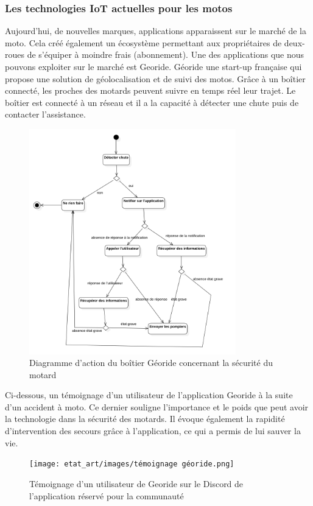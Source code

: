 \subsubsection{Les technologies IoT actuelles pour les motos}
Aujourd'hui, de nouvelles marques, applications\cite{iot_accessoire_moto} apparaissent sur le marché de la moto. Cela créé également un écosystème permettant aux propriétaires de deux-roues de s'équiper à moindre frais (abonnement). Une des applications que nous pouvons exploiter sur le marché est Georide. Géoride une start-up française qui propose une solution de géolocalisation et de suivi des motos. Grâce à un boîtier connecté, les proches des motards peuvent suivre en temps réel leur trajet. Le boîtier est connecté à un réseau et il a la capacité à détecter une chute puis de contacter l'assistance. 
\begin{figure}[H]
    \centering
    \includegraphics[width=0.8\textwidth]{images/diag_etat_georide.png} 
    \caption{Diagramme d'action du boîtier Géoride concernant la sécurité du motard}
\end{figure}
Ci-dessous, un témoignage d'un utilisateur de l'application Georide à la suite d'un accident à moto. Ce dernier souligne l'importance et le poids que peut avoir la technologie dans la sécurité des motards. Il évoque également la rapidité d'intervention des secours grâce à l'application, ce qui a permis de lui sauver la vie.
\begin{figure}[H]
    \centering
    \texttt{[image: etat\_art/images/témoignage géoride.png]} 
    \caption{Témoignage d'un utilisateur de Georide sur le Discord de l'application réservé pour la communauté}
    \label{temoignage}
\end{figure}
